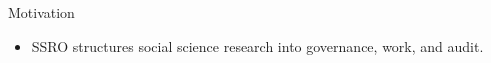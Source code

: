 \begin{frame}{Motivation}
\begin{itemize}
\item SSRO structures social science research into governance, work, and audit.
\end{itemize}
\end{frame}
